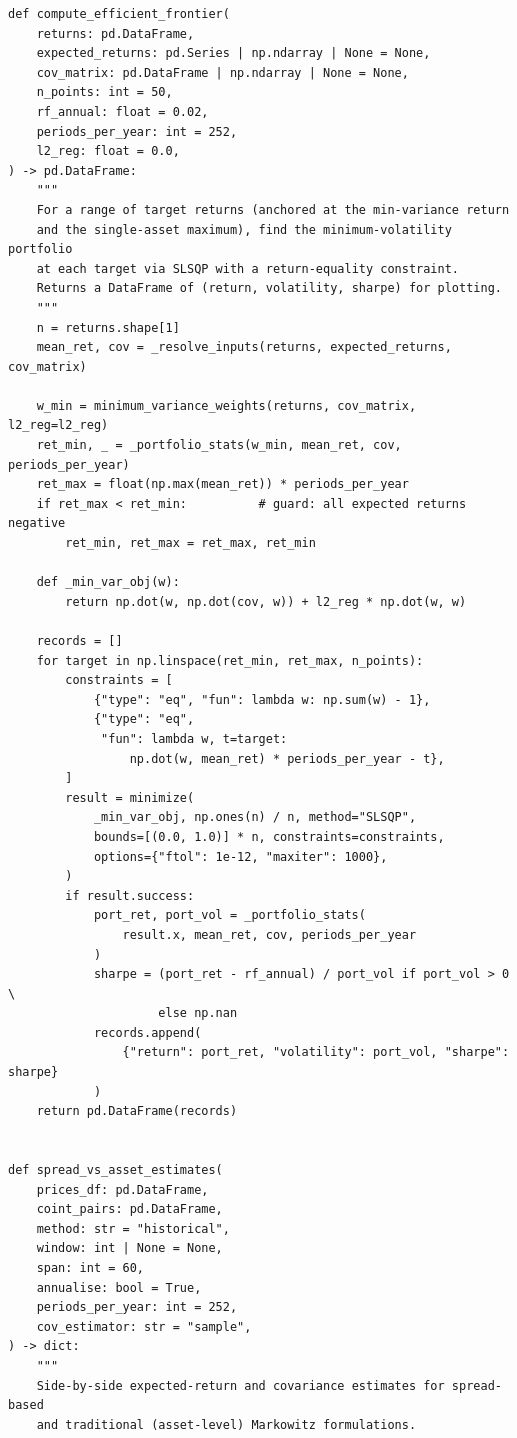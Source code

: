 \documentclass[a4paper]{report}
\begin{document}
\begin{Verbatim}[fontsize=\footnotesize, baselinestretch=0.85]
def compute_efficient_frontier(
    returns: pd.DataFrame,
    expected_returns: pd.Series | np.ndarray | None = None,
    cov_matrix: pd.DataFrame | np.ndarray | None = None,
    n_points: int = 50,
    rf_annual: float = 0.02,
    periods_per_year: int = 252,
    l2_reg: float = 0.0,
) -> pd.DataFrame:
    """
    For a range of target returns (anchored at the min-variance return
    and the single-asset maximum), find the minimum-volatility portfolio
    at each target via SLSQP with a return-equality constraint.
    Returns a DataFrame of (return, volatility, sharpe) for plotting.
    """
    n = returns.shape[1]
    mean_ret, cov = _resolve_inputs(returns, expected_returns, cov_matrix)

    w_min = minimum_variance_weights(returns, cov_matrix, l2_reg=l2_reg)
    ret_min, _ = _portfolio_stats(w_min, mean_ret, cov, periods_per_year)
    ret_max = float(np.max(mean_ret)) * periods_per_year
    if ret_max < ret_min:          # guard: all expected returns negative
        ret_min, ret_max = ret_max, ret_min

    def _min_var_obj(w):
        return np.dot(w, np.dot(cov, w)) + l2_reg * np.dot(w, w)

    records = []
    for target in np.linspace(ret_min, ret_max, n_points):
        constraints = [
            {"type": "eq", "fun": lambda w: np.sum(w) - 1},
            {"type": "eq",
             "fun": lambda w, t=target:
                 np.dot(w, mean_ret) * periods_per_year - t},
        ]
        result = minimize(
            _min_var_obj, np.ones(n) / n, method="SLSQP",
            bounds=[(0.0, 1.0)] * n, constraints=constraints,
            options={"ftol": 1e-12, "maxiter": 1000},
        )
        if result.success:
            port_ret, port_vol = _portfolio_stats(
                result.x, mean_ret, cov, periods_per_year
            )
            sharpe = (port_ret - rf_annual) / port_vol if port_vol > 0 \
                     else np.nan
            records.append(
                {"return": port_ret, "volatility": port_vol, "sharpe": sharpe}
            )
    return pd.DataFrame(records)


def spread_vs_asset_estimates(
    prices_df: pd.DataFrame,
    coint_pairs: pd.DataFrame,
    method: str = "historical",
    window: int | None = None,
    span: int = 60,
    annualise: bool = True,
    periods_per_year: int = 252,
    cov_estimator: str = "sample",
) -> dict:
    """
    Side-by-side expected-return and covariance estimates for spread-based
    and traditional (asset-level) Markowitz formulations.


\end{Verbatim}
\end{document}
